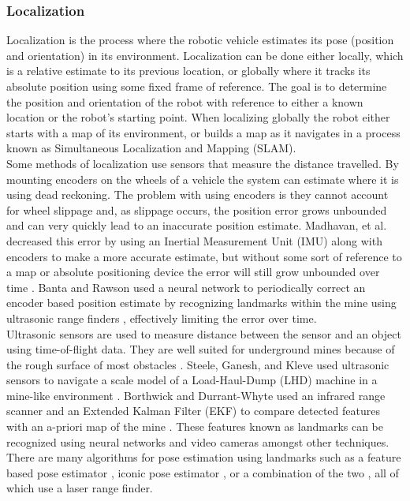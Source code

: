 \subsubsection{Localization}
\label{sec:local}

Localization is the process where the robotic vehicle estimates its pose (position and orientation) in its environment. Localization can be done either locally, which is a relative estimate to its previous location, or globally where it tracks its absolute position using some fixed frame of reference. The goal is to determine the position and orientation of the robot with reference to either a known location or the robot's starting point. When localizing globally the robot either starts with a map of its environment, or builds a map as it navigates in a process known as Simultaneous Localization and Mapping (SLAM).\\

Some methods of localization use sensors that measure the distance travelled. By mounting encoders on the wheels of a vehicle the system can estimate where it is using dead reckoning. The problem with using encoders is they cannot account for wheel slippage and, as slippage occurs, the position error grows unbounded and can very quickly lead to an inaccurate position estimate. Madhavan, et al. decreased this error by using an Inertial Measurement Unit (IMU) along with encoders to make a more accurate estimate, but without some sort of reference to a map or absolute positioning device the error will still grow unbounded over time \cite{madhavan}. Banta and Rawson used a neural network to periodically correct an encoder based position estimate by recognizing landmarks within the mine using ultrasonic range finders \cite{fusion}, effectively limiting the error over time.\\

Ultrasonic sensors are used to measure distance between the sensor and an object using time-of-flight data. They are well suited for underground mines because of the rough surface of most obstacles \cite{proof}. Steele, Ganesh, and Kleve used ultrasonic sensors to navigate a scale model of a Load-Haul-Dump (LHD) machine in a mine-like environment \cite{ganesh}. Borthwick and Durrant-Whyte used an infrared range scanner and an Extended Kalman Filter (EKF) to compare detected features with an a-priori map of the mine \cite{borth}. These features known as landmarks can be recognized using neural networks \cite{neural} and video cameras \cite{video} amongst other techniques. There are many algorithms for pose estimation using landmarks such as a feature based pose estimator \cite{feature}, iconic pose estimator \cite{iconic}, or a combination of the two \cite{both}, all of which use a laser range finder.\\

